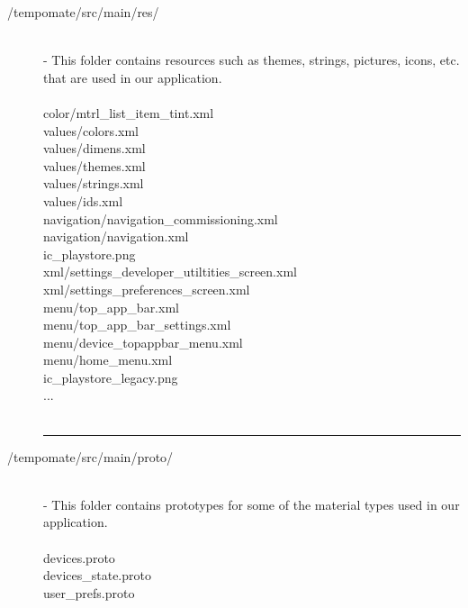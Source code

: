 \begin{enumerate}[label=\alph*]
\begin{description}
              \item[/tempomate/src/main/res/] \hfill \\
                    \small
                    - This folder contains resources such as themes, strings, pictures, icons, etc. that are used in our application.\\\\
                    \footnotesize
                    color/mtrl\_list\_item\_tint.xml  \\
                    values/colors.xml  \\
                    values/dimens.xml  \\
                    values/themes.xml  \\
                    values/strings.xml  \\
                    values/ids.xml  \\
                    navigation/navigation\_commissioning.xml  \\
                    navigation/navigation.xml  \\
                    ic\_playstore.png  \\
                    xml/settings\_developer\_utiltities\_screen.xml  \\
                    xml/settings\_preferences\_screen.xml  \\
                    menu/top\_app\_bar.xml  \\
                    menu/top\_app\_bar\_settings.xml  \\
                    menu/device\_topappbar\_menu.xml  \\
                    menu/home\_menu.xml  \\
                    ic\_playstore\_legacy.png  \\
                    ... \\\\

                    \vspace{-0.2cm}
                    \hrule
                    \vspace{0.2cm}

              \item[/tempomate/src/main/proto/] \hfill \\
                    \small
                    - This folder contains prototypes for some of the material types used in our application.\\\\
                    \footnotesize
                    devices.proto  \\
                    devices\_state.proto  \\
                    user\_prefs.proto  \\\\


\end{description}
\end{enumerate}
